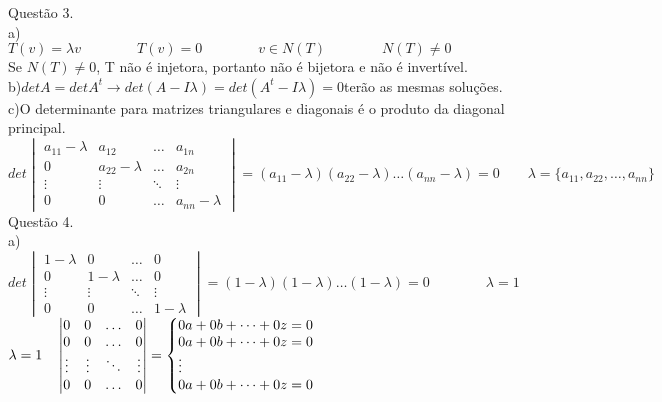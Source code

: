 \documentclass[12pt]{article}
\begin{document}
\noindent Questão 3.\\

\noindent a)\\

$T(v)=\lambda v\qquad\qquad T(v)=0\qquad\qquad v\in N(T)\qquad\qquad N(T)\neq0$\\

Se $N(T)\neq0$, T não é injetora, portanto não é bijetora e não é invertível.\\

\noindent b)\quad$detA=detA^{t}\longrightarrow det(A-I\lambda)=det(A^{t}-I\lambda)=0$\quad terão as mesmas soluções.\\

\noindent c)\quad O determinante para matrizes triangulares e diagonais é o produto da diagonal principal.\\

$det\begin{vmatrix}a_{11}-\lambda&a_{12}&\dots&a_{1n}\\0&a_{22}-\lambda&\dots&a_{2n}\\\vdots&\vdots&\ddots&\vdots\\0&0&\dots&a_{nn}-\lambda\end{vmatrix}=(a_{11}-\lambda)(a_{22}-\lambda)\dots(a_{nn}-\lambda)=0\qquad\lambda=\lbrace a_{11},a_{22},\dots,a_{nn}\rbrace$\\

\noindent Questão 4.\\

\noindent a)\\

$det\begin{vmatrix}1-\lambda&0&\dots&0\\0&1-\lambda&\dots&0\\\vdots&\vdots&\ddots&\vdots\\0&0&\dots&1-\lambda\end{vmatrix}=(1-\lambda)(1-\lambda)\dots(1-\lambda)=0\qquad\qquad\lambda=1$\\

$\lambda=1\quad\begin{vmatrix}0&0&\dots&0\\0&0&\dots&0\\\vdots&\vdots&\ddots&\vdots\\0&0&\dots&0\end{vmatrix}=\left\{\begin{array}{@{}l@{}}0a+0b+\dots+0z=0\\0a+0b+\dots+0z=0\\\vdots\\0a+0b+\dots+0z=0\end{array}\right.$\\
\end{document}
